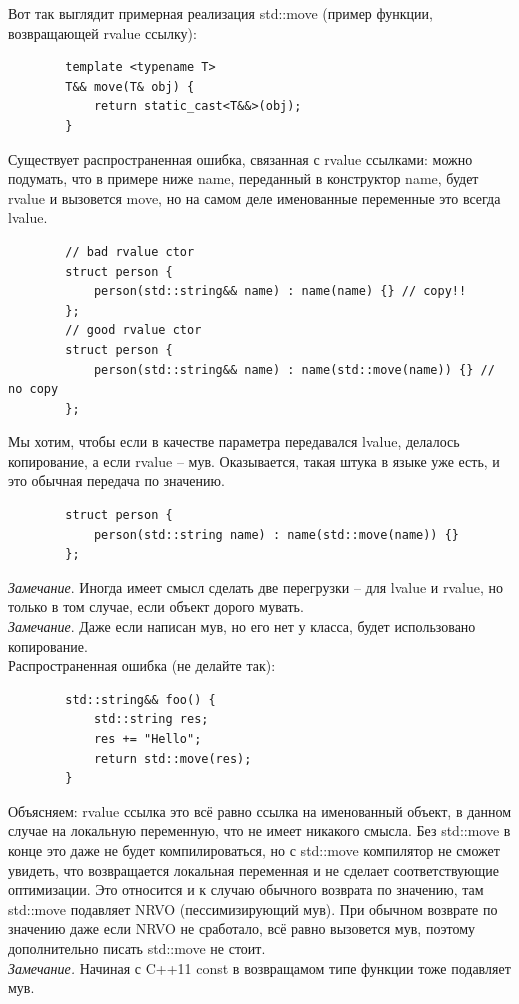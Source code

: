 \documentclass[12pt, a4paper]{article}
\begin{document}
	Вот так выглядит примерная реализация std::move (пример функции, возвращающей rvalue ссылку):
	\begin{verbatim}
		template <typename T>
		T&& move(T& obj) {
			return static_cast<T&&>(obj);
		}
	\end{verbatim}
	Существует распространенная ошибка, связанная с rvalue ссылками: можно подумать, что в примере ниже name, переданный в конструктор name, будет rvalue и вызовется move, но на самом деле именованные переменные это всегда lvalue.
	\begin{verbatim}
		// bad rvalue ctor
		struct person {
			person(std::string&& name) : name(name) {} // copy!! 
		};
		// good rvalue ctor
		struct person {
			person(std::string&& name) : name(std::move(name)) {} // no copy 
		};
	\end{verbatim}
	Мы хотим, чтобы если в качестве параметра передавался lvalue, делалось копирование, а если rvalue -- мув. Оказывается, такая штука в языке уже есть, и это обычная передача по значению.
	\begin{verbatim}
		struct person {
			person(std::string name) : name(std::move(name)) {}
		};
	\end{verbatim}
	\textit{Замечание}. Иногда имеет смысл сделать две перегрузки -- для lvalue и rvalue, но только в том случае, если объект дорого мувать.\\
	\textit{Замечание}. Даже если написан мув, но его нет у класса, будет использовано копирование.
	\\Распространенная ошибка (не делайте так):
	\begin{verbatim}
		std::string&& foo() {
			std::string res;
			res += "Hello";
			return std::move(res);
		}
	\end{verbatim}
	Объясняем: rvalue ссылка это всё равно ссылка на именованный объект, в данном случае на локальную переменную, что не имеет никакого смысла. Без std::move в конце это даже не будет компилироваться, но с std::move компилятор не сможет увидеть, что возвращается локальная переменная и не сделает соответствующие оптимизации. Это относится и к случаю обычного возврата по значению, там std::move подавляет NRVO (пессимизирующий мув). При обычном возврате по значению даже если NRVO не сработало, всё равно вызовется мув, поэтому дополнительно писать std::move не стоит.\\
	\textit{Замечание.} Начиная с C++11 const в возвращамом типе функции тоже подавляет мув. \\
\end{document}
